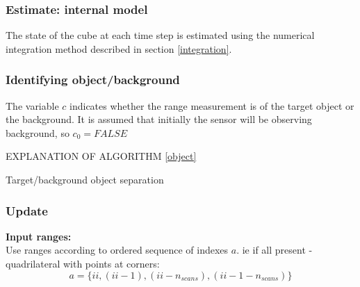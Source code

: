 	\subsubsection{Estimate: internal model}
		The state of the cube at each time step is estimated using the numerical integration method described in section \ref{integration}.
	
	\subsubsection{Identifying object/background}
		The variable $c$ indicates whether the range measurement is of the target object or the background. It is assumed that initially the sensor will be observing background, so $c_0 = FALSE$

		EXPLANATION OF ALGORITHM \ref{object}
		
		\IncMargin{2em}
		\begin{algorithm}
		\DontPrintSemicolon
	
		\caption{Target/background object separation} \label{object}
		\end{algorithm}
		
	\subsubsection{Update}
		\textbf{Input ranges:}\\
			Use ranges according to ordered sequence of indexes $a$. ie if all present - quadrilateral with points at corners:
			\begin{equation}
				a = \{ii,(ii-1),(ii-n_{scans}),(ii-1-n_{scans})\}
			\end{equation}
		
